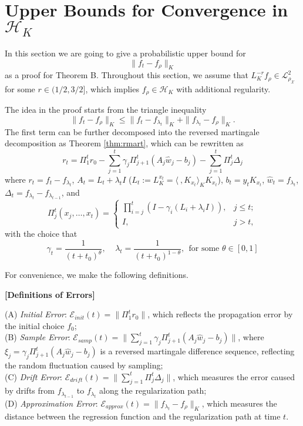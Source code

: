 \documentclass[twoside,11pt]{amsart}
\theoremstyle{theorem}
\theoremstyle{definition}
\theoremstyle{remark}
\newcommand{\DS}{\displaystyle}
\def\<{{\langle}}
\def\>{{\rangle}}
\def\L{{\mathscr L}}
\def\L2{{\mathscr L}^2_{\rho_\X}}
\def\w{\hat{w}}
\def\H{{\mathscr H}}
\def\X{{\mathscr X}}
\def\Err{{\mathscr E}}
\def\t{t_0}
\def\la{\lambda}
\begin{document}

\section{Upper Bounds for Convergence in $\H_K$} \label{sec:hk}


In this section we are going to give a probabilistic upper bound for
\[ \|f_t - f_\rho \|_K \]
as a proof for Theorem B. Throughout this section, we assume 
that $L_K^{-r} f_\rho\in \L2$ for some $r\in (1/2,3/2]$, which implies $f_\rho \in \H_K$ with additional regularity. 

The idea in the proof starts from the triangle inequality 
\[\|f_t - f_\rho\|_K\leq \|f_t - f_{\la_t}\|_K+\|f_{\la_t} - f_\rho\|_K. \] 
The first term can be further decomposed into the reversed martingale decomposition as Theorem \ref{thm:rmart}, which can be rewritten as
\begin{equation}  \label{eq:rmart1}
 r_t = \Pi_{1}^t r_0 - \sum_{j=1}^t \gamma_j \Pi_{j+1}^t (A_j \w_j - b_j) - \sum_{j=1}^t \Pi_{j}^t \Delta_j
\end{equation}
where $r_t = f_{t} - f_{\la_t}$, $A_t=L_t + \la_t I$ ($L_t:=L_K^{x_t}=\<\ ,K_{x_t}\>_K K_{x_t}$), $b_t = y_t K_{x_t}$, $\w_t = f_{\la_t}$, $\Delta_t = f_{\la_t} - f_{\la_{t-1}}$, and 
\begin{equation*} \Pi_j^t(x_j,\ldots,x_t)=
\left\{
\begin{array}{lr}
\DS \prod_{i=j}^t \left( I - \gamma_i (L_i + \la_i I) \right), & j\leq t; \\
I, & j>t,
\end{array}
\right.
\end{equation*}
with the choice that 
\[ \gamma_t = \frac{1}{(t+\t)^{\theta}}, \ \ \ \ \ \lambda_t = \frac{1}{(t+\t)^{1-\theta}}, \ \ \mbox{for some $\theta\in[0,1]$} \]

For convenience, we make the following definitions.

{\bf [Definitions of Errors]}

\noindent (A) \emph{Initial Error}: $\Err_{init}(t)=\|\Pi_1^t r_0\|$, which reflects the propagation error by the initial choice $f_0$; \\
\noindent (B) \emph{Sample Error}: $\Err_{samp}(t)=\|\sum_{j=1}^t \gamma_j \Pi_{j+1}^t (A_j \w_j - b_j)\|$, where $\xi_j =\gamma_j \Pi_{j+1}^t (A_j \w_j - b_j)$ 
is a reversed martingale difference sequence, reflecting the random fluctuation caused by sampling; \\
\noindent (C) \emph{Drift Error}: $\Err_{drift}(t)= \|\sum_{j=1}^t \Pi_{j}^t \Delta_j\|$, which measures the error caused by drifts from 
$f_{\la_{t-1}}$ to $f_{\la_t}$ along the regularization path; \\
\noindent (D) \emph{Approximation Error}: $\Err_{approx}(t)=\|f_{\la_t} - f_\rho\|_K$, which measures the distance between the regression function and
the regularization path at time $t$.
\end{document}
